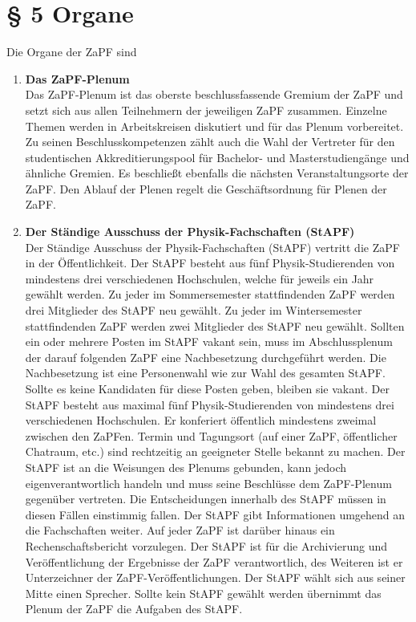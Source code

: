 \section*{§ 5 Organe}
  Die Organe der ZaPF sind
  \begin{enumerate}
    \item \textbf{Das ZaPF-Plenum}\\
          Das ZaPF-Plenum ist das oberste beschlussfassende Gremium der ZaPF
          und setzt sich aus allen Teilnehmern der jeweiligen ZaPF zusammen.
          Einzelne Themen werden in Arbeits\-kreisen diskutiert und für das
          Plenum vorbereitet. Zu seinen Beschlusskompetenzen zählt auch die
          Wahl der Vertreter für den studentischen Akkreditierungspool für
          Bachelor- und Masterstudiengänge und ähnliche Gremien.  Es beschließt
          ebenfalls die nächsten Veranstaltungsorte der ZaPF.  Den Ablauf der
          Plenen regelt die Geschäftsordnung für Plenen der ZaPF.
    \item \textbf{Der Ständige Ausschuss der Physik-Fachschaften (StAPF)}\\
          Der Ständige Ausschuss der Physik-Fachschaften (StAPF) vertritt die
          ZaPF in der Öffentlichkeit. Der StAPF besteht aus fünf Physik-Studierenden
          von mindestens drei verschiedenen Hochschulen, welche für jeweils ein
          Jahr gewählt werden. Zu jeder im Sommersemester stattfindenden ZaPF
          werden drei Mitglieder des StAPF neu gewählt. Zu jeder im Wintersemester
          stattfindenden ZaPF werden zwei Mitglieder des StAPF neu gewählt.
          Sollten ein oder mehrere Posten im StAPF vakant sein, muss im
          Abschlussplenum der darauf folgenden ZaPF eine Nachbesetzung
          durchgeführt werden. Die Nachbesetzung ist eine Personenwahl wie zur
          Wahl des gesamten StAPF. Sollte es keine Kandidaten für diese Posten
          geben, bleiben sie vakant. Der StAPF besteht aus maximal fünf
          Physik-Studierenden von mindestens drei verschiedenen Hochschulen.
          Er konferiert öffentlich mindestens zweimal zwischen den ZaPFen.
          Termin und Tagungsort (auf einer ZaPF, öffentlicher Chatraum, etc.)
          sind rechtzeitig an geeigneter Stelle bekannt zu machen. Der StAPF ist
          an die Weisungen des Plenums gebunden, kann jedoch eigenverantwortlich
          handeln und muss seine Beschlüsse dem ZaPF-Plenum gegenüber vertreten.
          Die Entscheidungen innerhalb des StAPF müssen in diesen Fällen einstimmig
          fallen. Der StAPF gibt Informationen umgehend an die Fachschaften weiter.
          Auf jeder ZaPF ist darüber hinaus ein Rechenschaftsbericht vorzulegen.
          Der StAPF ist für die Archivierung und Veröffentlichung der Ergebnisse
          der ZaPF verantwortlich, des Weiteren ist er Unterzeichner der
          ZaPF-Veröffentlichungen. Der StAPF wählt sich aus seiner Mitte einen
          Sprecher. Sollte kein StAPF gewählt werden übernimmt das Plenum der
          ZaPF die Aufgaben des StAPF.
  \end{enumerate}

